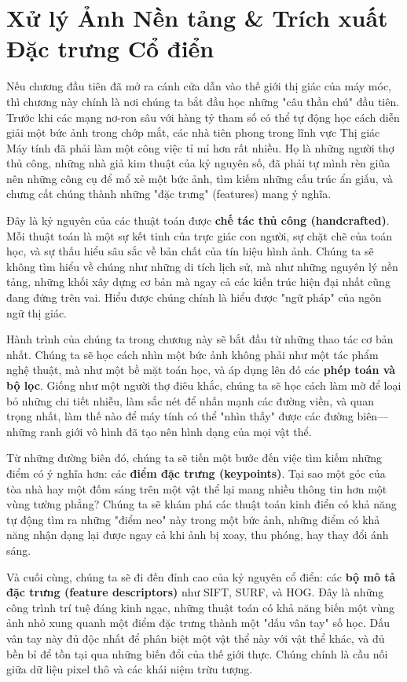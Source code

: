 \chapter{Xử lý Ảnh Nền tảng \& Trích xuất Đặc trưng Cổ điển}
\label{chap:classical_vision}

Nếu chương đầu tiên đã mở ra cánh cửa dẫn vào thế giới thị giác của máy móc, thì chương này chính là nơi chúng ta bắt đầu học những "câu thần chú" đầu tiên. Trước khi các mạng nơ-ron sâu với hàng tỷ tham số có thể tự động học cách diễn giải một bức ảnh trong chớp mắt, các nhà tiên phong trong lĩnh vực Thị giác Máy tính đã phải làm một công việc tỉ mỉ hơn rất nhiều. Họ là những người thợ thủ công, những nhà giả kim thuật của kỷ nguyên số, đã phải tự mình rèn giũa nên những công cụ để mổ xẻ một bức ảnh, tìm kiếm những cấu trúc ẩn giấu, và chưng cất chúng thành những "đặc trưng" (features) mang ý nghĩa.

Đây là kỷ nguyên của các thuật toán được \textbf{chế tác thủ công (handcrafted)}. Mỗi thuật toán là một sự kết tinh của trực giác con người, sự chặt chẽ của toán học, và sự thấu hiểu sâu sắc về bản chất của tín hiệu hình ảnh. Chúng ta sẽ không tìm hiểu về chúng như những di tích lịch sử, mà như những nguyên lý nền tảng, những khối xây dựng cơ bản mà ngay cả các kiến trúc hiện đại nhất cũng đang đứng trên vai. Hiểu được chúng chính là hiểu được "ngữ pháp" của ngôn ngữ thị giác.

Hành trình của chúng ta trong chương này sẽ bắt đầu từ những thao tác cơ bản nhất. Chúng ta sẽ học cách nhìn một bức ảnh không phải như một tác phẩm nghệ thuật, mà như một bề mặt toán học, và áp dụng lên đó các \textbf{phép toán và bộ lọc}. Giống như một người thợ điêu khắc, chúng ta sẽ học cách làm mờ để loại bỏ những chi tiết nhiễu, làm sắc nét để nhấn mạnh các đường viền, và quan trọng nhất, làm thế nào để máy tính có thể "nhìn thấy" được các đường biên—những ranh giới vô hình đã tạo nên hình dạng của mọi vật thể.

Từ những đường biên đó, chúng ta sẽ tiến một bước đến việc tìm kiếm những điểm có ý nghĩa hơn: các \textbf{điểm đặc trưng (keypoints)}. Tại sao một góc của tòa nhà hay một đốm sáng trên một vật thể lại mang nhiều thông tin hơn một vùng tường phẳng? Chúng ta sẽ khám phá các thuật toán kinh điển có khả năng tự động tìm ra những "điểm neo" này trong một bức ảnh, những điểm có khả năng nhận dạng lại được ngay cả khi ảnh bị xoay, thu phóng, hay thay đổi ánh sáng.

Và cuối cùng, chúng ta sẽ đi đến đỉnh cao của kỷ nguyên cổ điển: các \textbf{bộ mô tả đặc trưng (feature descriptors)} như SIFT, SURF, và HOG. Đây là những công trình trí tuệ đáng kinh ngạc, những thuật toán có khả năng biến một vùng ảnh nhỏ xung quanh một điểm đặc trưng thành một "dấu vân tay" số học. Dấu vân tay này đủ độc nhất để phân biệt một vật thể này với vật thể khác, và đủ bền bỉ để tồn tại qua những biến đổi của thế giới thực. Chúng chính là cầu nối giữa dữ liệu pixel thô và các khái niệm trừu tượng.

